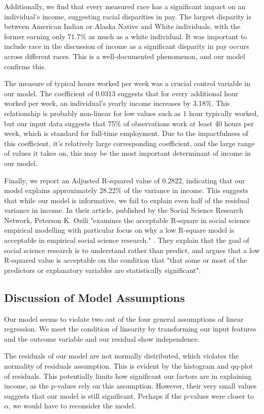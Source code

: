 \documentclass{article}
\begin{document}
Additionally, we find that every measured race has a significant impact on an individual's income, suggesting racial disparities in pay. The largest disparity is between American Indian or Alaska Native and White individuals, with the former earning only 71.7\% as much as a white individual. 
It was important to include race in the discussion of income as a significant disparity in pay occurs across different races. This is a well-documented phenomenon, and our model confirms this.

The measure of typical hours worked per week was a crucial control variable in our model.
The coefficient of 0.0313 suggests that for every additional hour worked per week, an individual's yearly income increases by 3.18\%. This relationship is probably non-linear for low values such as 1 hour typically worked, but our input data suggests that 75\% of observations work at least 40 hours per week, which is standard for full-time employment.
Due to the impactfulness of this coefficient, it's relatively large corresponding coefficient, and the large range of values it takes on, this may be the most important determinant of income in our model.

Finally, we report an Adjusted R-squared value of 0.2822, indicating that our model explains approximately 28.22\% of the variance in income.
This suggests that while our model is informative, we fail to explain even half of the residual variance in income.
In their article, published by the Social Science Research Network, Peterson K. Ozili "examines the acceptable R-square in social science empirical modelling with particular focus on why a low R-square model is acceptable in empirical social science research." \cite{ozili}.
They explain that the goal of social science research is to understand rather than predict, and argues that a low R-squared value is acceptable on the condition that "that some or most of the predictors or explanatory variables are statistically significant"\cite{ozili}.

\subsection*{Discussion of Model Assumptions}
Our model seems to violate two out of the four general assumptions of linear regression. We meet the condition of linearity by transforming our input features
and the outcome variable and our residual show independence.

The residuals of our model are not normally distributed, which violates the normality of residuals assumption. This is evident by the histogram and qq-plot of residuals.
This potentially limits how significant our factors are in explaining income, as the p-values rely on this assumption. However, their very small values suggests that our model is still significant.
Perhaps if the p-values were closer to $\alpha$, we would have to reconsider the model.
\end{document}
